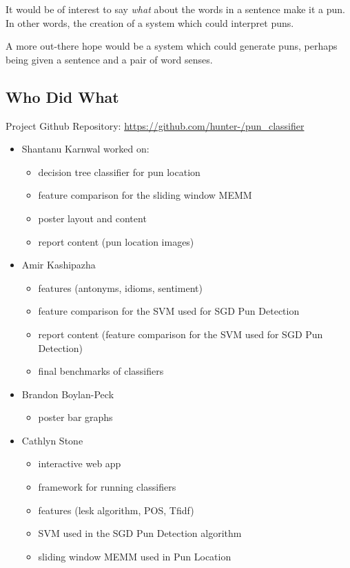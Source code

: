 \documentclass{article}
\begin{document}
It would be of interest to say \emph{what} about the words in a sentence make it
a pun. In other words, the creation of a system which could interpret puns.

A more out-there hope would be a system which could generate puns, perhaps being
given a sentence and a pair of word senses.

\subsection{Who Did What}

Project Github Repository: \url{https://github.com/hunter-/pun_classifier}

\begin{itemize}
\item Shantanu Karnwal worked on:
	\begin{itemize}
		\item decision tree classifier for pun location
		\item feature comparison for the sliding window MEMM
		\item poster layout and content
		\item report content (pun location images)
	\end{itemize}
\item Amir Kashipazha
	\begin{itemize}
		\item features (antonyms, idioms, sentiment)
		\item feature comparison for the SVM used for SGD Pun Detection
		\item report content (feature comparison for the SVM used for SGD Pun Detection)
		\item final benchmarks of classifiers
	\end{itemize}
\item Brandon Boylan-Peck
	\begin{itemize}
		\item poster bar graphs
	\end{itemize}
\item Cathlyn Stone
	\begin{itemize}
		\item interactive web app
		\item framework for running classifiers
		\item features (lesk algorithm, POS, Tfidf)
		\item SVM used in the SGD Pun Detection algorithm
		\item sliding window MEMM used in Pun Location

\end{itemize}
\end{itemize}
\end{document}
